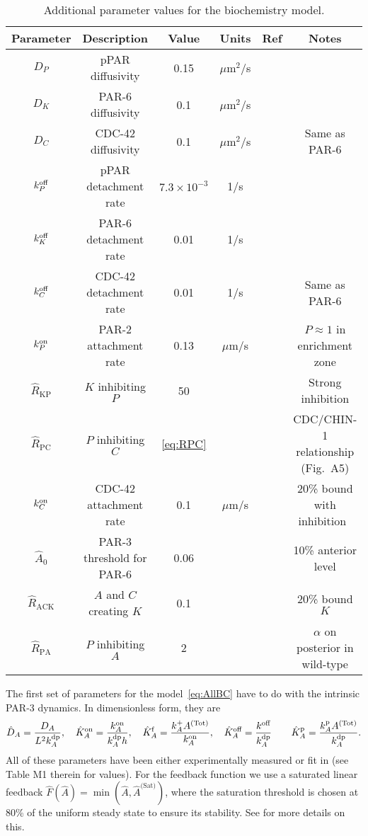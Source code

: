\documentclass[11pt]{article}
\newcommand{\6}[1]{#1_{\text{6}}}
\newcommand{\3}[1]{#1_{\text{3}}}
\newcommand{\Tot}[1]{#1^\text{(Tot)}}
\newcommand{\Sat}[1]{#1^\text{(Sat)}}
\newcommand{\A}[1]{#1_A}
\begin{document}
\begin{table}
\begin{small}
\centering
\begin{tabular}{|c|c|c|c|c|c|}\hline
Parameter & Description & Value & Units & Ref & Notes \\ \hline
$D_P$ & pPAR diffusivity & 0.15 & $\mu$m$^2$/s & \cite{goehring2011polarization}&  \\ 
$D_K$ & PAR-6 diffusivity & 0.1 & $\mu$m$^2$/s & \cite{robin2014single}&  \\ 
$D_C$ & CDC-42 diffusivity & 0.1 & $\mu$m$^2$/s && Same as PAR-6 \\ 
$k^\text{off}_P$ & pPAR detachment rate & $7.3 \times 10^{-3}$ & 1/s & \cite{goehring2011polarization}&  \\  
$k^\text{off}_K$ & PAR-6 detachment rate & 0.01 & 1/s & \cite{robin2014single}&  \\  
$k^\text{off}_C$ & CDC-42 detachment rate & 0.01 & 1/s & &  Same as PAR-6\\  \hline
$k^\text{on}_P$ & PAR-2 attachment rate & 0.13 & $\mu$m/s & \cite{gross2019guiding} & $P \approx 1$ in enrichment zone\\
$\hat{R}_\text{KP}$ & $K$ inhibiting $P$ &50  &  &  & Strong inhibition\\
$\hat R_\text{PC}$ & $P$ inhibiting $C$ & \eqref{eq:RPC}  & & \cite{sailer2015dynamic} & CDC/CHIN-1 relationship (Fig.\ A5)\\ 
$k^\text{on}_C$ & CDC-42 attachment rate & 0.1 & $\mu$m/s & & 20\% bound with inhibition\ \\ 
$\hat A_0$ & PAR-3 threshold for PAR-6 & 0.06&  & \cite{sailer2015dynamic}& 10\% anterior level \\
$\hat{R}_\text{ACK}$ & $A$ and $C$ creating $K$ & 0.1  &  &  & 20\% bound $K$\\
$\hat{R}_\text{PA}$ & $P$ inhibiting $A$ & 2  &  &  & $\alpha$ on posterior in wild-type\\ \hline
\end{tabular}
\caption{\label{tab:paramsBC}Additional parameter values for the biochemistry model.}
\end{small}
\end{table}

The first set of parameters for the model\ \eqref{eq:AllBC} have to do with the intrinsic PAR-3 dynamics. In dimensionless form, they are 
\begin{equation*}
\DhatA =\frac{D_A}{L^2 \A{\kdp}}, \quad \KhatonA=\frac{\A{\kon}}{\A{\kdp} h }, \quad \KhatfA = \frac{\A{\kf}\Tot{A}}{\A{\kon}}, \quad  \KhatoffA = \frac{\koff}{\A{\kdp}} \qquad \KhatpA = \frac{\A{\kp} \Tot{A}}{\A{\kdp}}.
\end{equation*}
All of these parameters have been either experimentally measured or fit in \cite{lang2023oligomerization} (see Table M1 therein for values).  For the feedback function we use a saturated linear feedback $\hat F(\hat A) = \min\left(\hat A, \Sat{\hat A}\right)$, where the saturation threshold is chosen at 80\% of the uniform steady state to ensure its stability. See \cite{lang2023oligomerization} for more details on this. 
\end{document}
